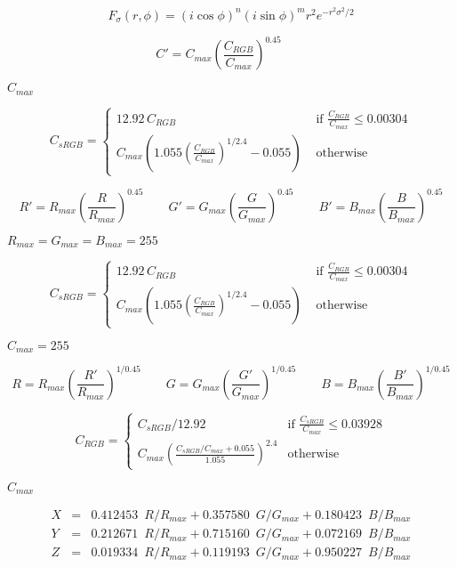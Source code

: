 \documentclass{article}
\begin{document}
\[ F_{\sigma}(r, \phi)=(i \cos \phi)^n (i \sin \phi)^m r^2 e^{-r^2 \sigma^2 / 2} \]
\pagebreak

\[ C' = C_{max} \left(\frac{C_{RGB}}{C_{max}} \right)^{0.45} \qquad \]
\pagebreak

$ C_{max} $
\pagebreak

\[ C_{sRGB} = \left\{\begin{array}{ll} 12.92\,C_{RGB} & \textrm{ if }\frac{C_{RGB}}{C_{max}} \le 0.00304 \\ C_{max}\left( 1.055 \left(\frac{C_{RGB}}{C_{max}}\right)^{1/2.4}-0.055\right) & \textrm{ otherwise} \end{array} \right. \]
\pagebreak

\[ R' = R_{max} \left(\frac{R}{R_{max}} \right)^{0.45} \qquad G' = G_{max} \left(\frac{G}{G_{max}} \right)^{0.45} \qquad B' = B_{max} \left(\frac{B}{B_{max}} \right)^{0.45} \]
\pagebreak

$ R_{max} = G_{max} = B_{max} = 255 $
\pagebreak

\[ C_{sRGB} = \left\{ \begin{array}{ll} 12.92\,C_{RGB} & \textrm{ if }\frac{C_{RGB}}{C_{max}} \le 0.00304 \\ C_{max}\left( 1.055 \left(\frac{C_{RGB}}{C_{max}}\right)^{1/2.4}-0.055\right) & \textrm{ otherwise} \end{array} \right. \]
\pagebreak

$ C_{max} = 255 $
\pagebreak

\[ R = R_{max} \left(\frac{R'}{R_{max}} \right)^{1/0.45} \qquad G = G_{max} \left(\frac{G'}{G_{max}} \right)^{1/0.45} \qquad B = B_{max} \left(\frac{B'}{B_{max}} \right)^{1/0.45} \]
\pagebreak

\[ C_{RGB} = \left\{\begin{array}{ll} C_{sRGB} / 12.92 & \textrm{if }\frac{C_{sRGB}}{C_{max}} \le 0.03928 \\ C_{max}\left( \frac{C_{sRGB}/C_{max}+0.055}{1.055}\right)^{2.4} & \textrm{otherwise} \end{array}\right. \]
\pagebreak

$ C_{max}$
\pagebreak

\[ \begin{array}{rcl} X & = & 0.412453\enspace R / R_{max} + 0.357580\enspace G / G_{max} + 0.180423\enspace B / B_{max}\\ Y & = & 0.212671\enspace R / R_{max} + 0.715160\enspace G / G_{max} + 0.072169\enspace B / B_{max} \\ Z & = & 0.019334\enspace R / R_{max} + 0.119193\enspace G / G_{max} + 0.950227\enspace B / B_{max} \end{array} \]
\pagebreak
\end{document}
